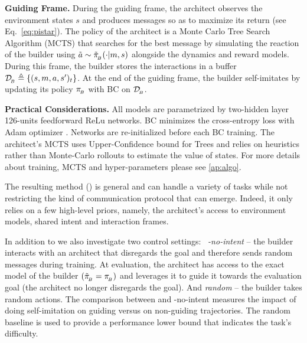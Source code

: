 \textbf{Guiding Frame. } During the guiding frame, the architect observes the environment states $s$ and produces messages so as to maximize its return (see Eq.~\ref{eq:pistar}). The policy of the architect is a Monte Carlo Tree Search Algorithm (MCTS) \cite{kocsis2006bandit} that searches for the best message by simulating the reaction of the builder using $\tilde{a} \sim \tilde{\pi}_{\!_B}(\cdot|m,s)$ alongside the dynamics and reward models. During this frame, the builder stores the interactions in a buffer $\mathcal{D}_{\!_B} \triangleq\{(s,m,a,s')_t\}$. At the end of the guiding frame, the builder self-imitates by updating its policy $\pi_{\!_B}$ with BC on $\mathcal{D}_{\!_B}$.
%

\textbf{Practical Considerations. } All models are parametrized by two-hidden layer 126-units feedforward ReLu networks. BC minimizes the cross-entropy loss with Adam optimizer \cite{kingma2014adam}. Networks are re-initialized before each BC training. The architect's MCTS uses Upper-Confidence bound for Trees and relies on heuristics rather than Monte-Carlo rollouts to estimate the value of states. For more details about training, MCTS and hyper-parameters please see \ap\ref{ap:algo}.

The resulting method (\abig) is general and can handle a variety of tasks while not restricting the kind of communication protocol that can emerge. Indeed, it only relies on a few high-level priors, namely, the architect's access to environment models, shared intent and interaction frames. 

In addition to \abig we also investigate two control settings: 
 \abig~\textit{-no-intent} -- the builder interacts with an architect that disregards the goal and therefore sends random messages during training. At evaluation, the architect has access to the exact model of the builder $(\tilde{\pi}_{\!_B}= \pi_{\!_B})$ and leverages it to guide it towards the evaluation goal (the architect no longer disregards the goal). And \textit{random} -- the builder takes random actions.
The comparison between \abig and \abig-no-intent measures the impact of doing self-imitation on guiding versus on non-guiding trajectories. The random baseline is used to provide a performance lower bound that indicates the task's difficulty.

